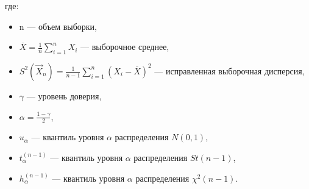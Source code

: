 где:
\begin{itemize}[label=]
    \item n --- объем выборки,
    \item $\overline X = \frac {1}{n} \sum_{i=1}^n X_i$ --- выборочное среднее,
    \item $S^2(\vec X_n) = \frac 1{n-1} \sum_{i=1}^n (X_i-\overline X)^2$ --- исправленная выборочная дисперсия,
    \item $\gamma$ --- уровень доверия,
    \item $\alpha = \frac{1 - \gamma}{2}$,
    \item $u_{\alpha}$ --- квантиль уровня $\alpha$ распределения $N(0,1)$,
	\item $t_{\alpha}^{(n-1)}$ --- квантиль уровня $\alpha$ распределения $St(n - 1)$,
	\item $h_{\alpha}^{(n-1)}$ --- квантиль уровня $\alpha$ распределения $\chi^2 (n - 1)$.
\end{itemize}